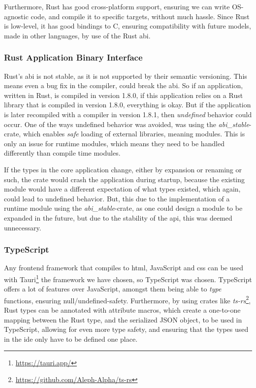 Furthermore, Rust has good cross-platform support, ensuring
we can write OS-agnostic code, and compile it to specific targets, without much
hassle. Since Rust is low-level, it has good bindings to C, ensuring
compatibility with future models, made in other languages, by use of the Rust
\gls*{abi}.

\subsubsection{Rust Application Binary Interface}

Rust's \gls*{abi} is not stable, as it is not supported by their semantic
versioning. This means even a bug fix in the compiler, could break the
\gls*{abi}. So if an application, written in Rust, is compiled in version 1.8.0,
if this application relies on a Rust library that is compiled in version 1.8.0,
everything is okay. But if the application is later recompiled with a compiler
in version 1.8.1, then \textit{undefined} behavior could occur. One of the ways
undefined behavior was avoided, was using the \textit{abi\_stable}-crate, which
enables \textit{safe} loading of external libraries, meaning modules. This is
only an issue for runtime modules, which means they need to be handled
differently than compile time modules.

If the types in the core application change, either by expansion or renaming or
such, the crate would crash the application during startup, because the existing
module would have a different expectation of what types existed, which again,
could lead to undefined behavior. But, this due to the implementation of a
runtime module using the \textit{abi\_stable}-crate, as one could design a
module to be expanded in the future, but due to the stability of the \gls*{api},
this was deemed unnecessary.


\subsubsection{TypeScript}

Any frontend framework that compiles to \gls*{html}, JavaScript and \gls*{css}
can be used with Tauri\footnote{\url{https://tauri.app/}} the framework we have
chosen, so TypeScript was chosen. TypeScript offers a lot of features over
JavaScript, amongst them being able to \textit{type} functions, ensuring
null/undefined-safety. Furthermore, by using crates like \textit{ts-rs}\footnote{\url{https://github.com/Aleph-Alpha/ts-rs}},
Rust types can be annotated with attribute macros, which create a one-to-one
mapping between the Rust type, and the serialized JSON object, to be used in
TypeScript, allowing for even more type safety, and ensuring that the types used
in the \gls*{ide} only have to be defined one place.

